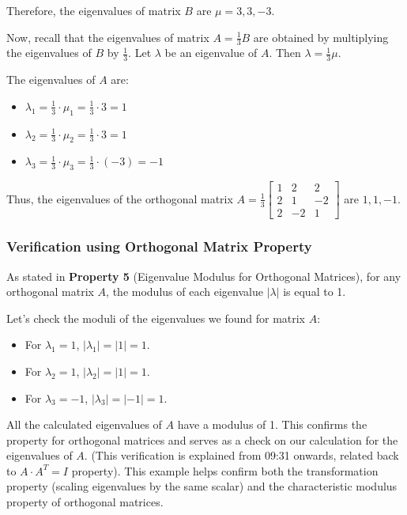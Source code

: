\documentclass{article}
\begin{document}
    Therefore, the eigenvalues of matrix $B$ are $\mu = 3, 3, -3$.

Now, recall that the eigenvalues of matrix $A = \frac{1}{3}B$ are obtained by multiplying the eigenvalues of $B$ by $\frac{1}{3}$.
Let $\lambda$ be an eigenvalue of $A$. Then $\lambda = \frac{1}{3}\mu$.

The eigenvalues of $A$ are:
\begin{itemize}
    \item $\lambda_1 = \frac{1}{3} \cdot \mu_1 = \frac{1}{3} \cdot 3 = 1$
    \item $\lambda_2 = \frac{1}{3} \cdot \mu_2 = \frac{1}{3} \cdot 3 = 1$
    \item $\lambda_3 = \frac{1}{3} \cdot \mu_3 = \frac{1}{3} \cdot (-3) = -1$
\end{itemize}

Thus, the eigenvalues of the orthogonal matrix $A = \frac{1}{3} \begin{bmatrix} 1 & 2 & 2 \\ 2 & 1 & -2 \\ 2 & -2 & 1 \end{bmatrix}$ are $1, 1, -1$.

\subsubsection*{Verification using Orthogonal Matrix Property}
As stated in \textbf{Property 5} (Eigenvalue Modulus for Orthogonal Matrices), for any orthogonal matrix $A$, the modulus of each eigenvalue $|\lambda|$ is equal to 1.

Let's check the moduli of the eigenvalues we found for matrix $A$:
\begin{itemize}
    \item For $\lambda_1 = 1$, $|\lambda_1| = |1| = 1$.
    \item For $\lambda_2 = 1$, $|\lambda_2| = |1| = 1$.
    \item For $\lambda_3 = -1$, $|\lambda_3| = |-1| = 1$.
\end{itemize}
All the calculated eigenvalues of $A$ have a modulus of 1. This confirms the property for orthogonal matrices and serves as a check on our calculation for the eigenvalues of $A$. (This verification is explained from 09:31 onwards, related back to $A \cdot A^T = I$ property). This example helps confirm both the transformation property (scaling eigenvalues by the same scalar) and the characteristic modulus property of orthogonal matrices.
\end{document}

